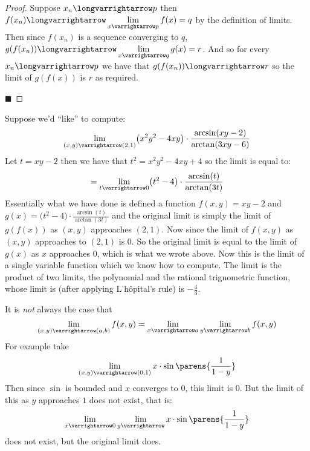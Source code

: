 \documentclass[10pt]{article}
\let\ds=\displaystyle
\begin{document}
\begin{proof}

    Suppose $x_n\longvarrightarrow p$ then $f(x_n)\longvarrightarrow \ds\lim_{x\varrightarrow p}f(x) = q$ by the definition of limits.
    Then since $f(x_n)$ is a sequence converging to $q$, $g(f(x_n))\longvarrightarrow \ds\lim_{x\varrightarrow q}g(x) = r$.
    And so for every $x_n\longvarrightarrow p$ we have that $g(f(x_n))\longvarrightarrow r$ so the limit of $g(f(x))$ is $r$ as required.

    \hfill$\blacksquare$

\end{proof}

\begin{exam}

    Suppose we'd ``like'' to compute:
    \[ \lim_{(x,y)\varrightarrow(2,1)} \bigl(x^2y^2 - 4xy\bigr)\cdot\frac{\arcsin(xy-2)}{\arctan(3xy-6)} \]
    Let $t=xy-2$ then we have that $t^2=x^2y^2-4xy+4$ so the limit is equal to:
    \[ = \lim_{t\varrightarrow0} \bigl(t^2 - 4\bigr)\cdot\frac{\arcsin(t)}{\arctan(3t)} \]
    Essentially what we have done is defined a function $f(x,y)=xy-2$ and $g(x)=\bigl(t^2 - 4\bigr)\cdot\frac{\arcsin(t)}{\arctan(3t)}$ and the original limit is simply the limit of $g(f(x))$ as $(x,y)$
    approaches $(2,1)$.
    Now since the limit of $f(x,y)$ as $(x,y)$ approaches to $(2,1)$ is $0$.
    So the original limit is equal to the limit of $g(x)$ as $x$ approaches $0$, which is what we wrote above.
    Now this is the limit of a single variable function which we know how to compute.
    The limit is the product of two limits, the polynomial and the rational trignometric function, whose limit is (after applying L'h\^opital's rule) is $-\frac43$.

\end{exam}

\begin{exam}

    It is \emph{not} always the case that
    \[ \lim_{(x,y)\varrightarrow(a,b)}f(x,y) = \lim_{x\varrightarrow a}\lim_{y\varrightarrow b}f(x,y) \]
    For example take
    \[ \lim_{(x,y)\varrightarrow(0,1)}x\cdot\sin\parens{\frac1{1-y}} \]
    Then since $\sin$ is bounded and $x$ converges to $0$, this limit is $0$.
    But the limit of this as $y$ approaches $1$ does not exist, that is:
    \[ \lim_{x\varrightarrow0}\lim_{y\varrightarrow} x\cdot\sin\parens{\frac1{1-y}} \]
    does not exist, but the original limit does.

\end{exam}
\end{document}
